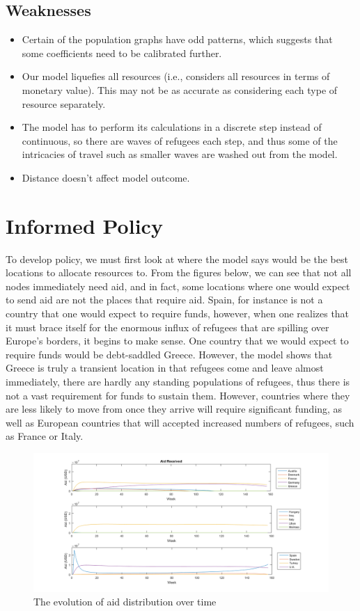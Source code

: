 \documentclass{article}
\begin{document}
\subsection{Weaknesses}
\begin{itemize}
    \item Certain of the population graphs have odd patterns, which suggests that some coefficients need to be calibrated further.
    \item Our model liquefies all resources (i.e., considers all resources in terms of monetary value). This may not be as accurate as considering each type of resource separately.
    \item The model has to perform its calculations in a discrete step instead of continuous, so there are waves of refugees each step, and thus some of the intricacies of travel such as smaller waves are washed out from the model.
    \item Distance doesn't affect model outcome. 
\end{itemize}

\section{Informed Policy}
To develop policy, we must first look at where the model says would be the best locations to allocate resources to. From the figures below, we can see that not all nodes immediately need aid, and in fact, some locations where one would expect to send aid are not the places that require aid. Spain, for instance is not a country that one would expect to require funds, however, when one realizes that it must brace itself for the enormous influx of refugees that are spilling over Europe's borders, it begins to make sense. One country that we would expect to require funds would be debt-saddled Greece. However, the model shows that Greece is truly a transient location in that refugees come and leave almost immediately, there are hardly any standing populations of refugees, thus there is not a vast requirement for funds to sustain them. However, countries where they are less likely to move from once they arrive will require significant funding, as well as European countries that will accepted increased numbers of refugees, such as France or Italy.

\begin{figure}[H]
    \centering
    \includegraphics[width=\textwidth]{aid/aidcountrytime.png}
    \caption [width=0.9\textwidth]{\centering The evolution of aid distribution over time}
\end{figure}
\end{document}
